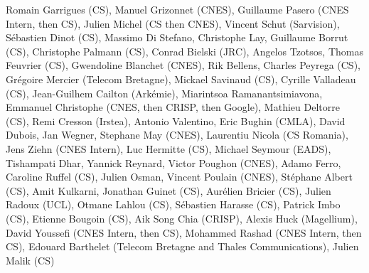 Romain Garrigues (CS), Manuel Grizonnet (CNES), Guillaume Pasero (CNES Intern, then CS), Julien Michel (CS then CNES), Vincent Schut (Sarvision), S\'ebastien Dinot (CS), Massimo Di Stefano, Christophe Lay, Guillaume Borrut (CS), Christophe Palmann (CS), Conrad Bielski (JRC), Angelos Tzotsos, Thomas Feuvrier (CS), Gwendoline Blanchet (CNES), Rik Bellens, Charles Peyrega (CS), Gr\'egoire Mercier (Telecom Bretagne), Mickael Savinaud (CS), Cyrille Valladeau (CS), Jean-Guilhem Cailton (Ark\'emie), Miarintsoa Ramanantsimiavona, Emmanuel Christophe (CNES, then CRISP, then Google), Mathieu Deltorre (CS), Remi Cresson (Irstea), Antonio Valentino, Eric Bughin (CMLA), David Dubois, Jan Wegner, Stephane May (CNES), Laurentiu Nicola (CS Romania), Jens Ziehn (CNES Intern), Luc Hermitte (CS), Michael Seymour (EADS), Tishampati Dhar, Yannick Reynard, Victor Poughon (CNES), Adamo Ferro, Caroline Ruffel (CS), Julien Osman, Vincent Poulain (CNES), St\'ephane Albert (CS), Amit Kulkarni, Jonathan Guinet (CS), Aur\'elien Bricier (CS), Julien Radoux (UCL), Otmane Lahlou (CS), S\'ebastien Harasse (CS), Patrick Imbo (CS), Etienne Bougoin (CS), Aik Song Chia (CRISP), Alexis Huck (Magellium), David Youssefi  (CNES Intern, then CS), Mohammed Rashad (CNES Intern, then CS), Edouard Barthelet (Telecom Bretagne and Thales Communications), Julien Malik (CS)